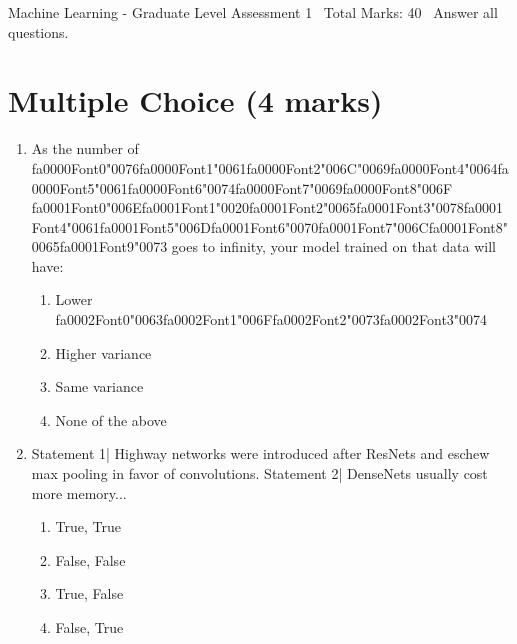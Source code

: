 \documentclass[12pt]{article}
\begin{document}
\begin{center}
Machine Learning - Graduate Level Assessment 1 \
Total Marks: 40 \
Answer all questions.
\end{center}

\section*{Multiple Choice (4 marks)}
\begin{enumerate}[label=\arabic*.]
\item As the number of {\csname fa0000Font0\endcsname\char"0076}{\csname fa0000Font1\endcsname\char"0061}{\csname fa0000Font2\endcsname\char"006C}{\char"0069}{\csname fa0000Font4\endcsname\char"0064}{\csname fa0000Font5\endcsname\char"0061}{\csname fa0000Font6\endcsname\char"0074}{\csname fa0000Font7\endcsname\char"0069}{\csname fa0000Font8\endcsname\char"006F} {\csname fa0001Font0\endcsname\char"006E}{\csname fa0001Font1\endcsname\char"0020}{\csname fa0001Font2\endcsname\char"0065}{\csname fa0001Font3\endcsname\char"0078}{\csname fa0001Font4\endcsname\char"0061}{\csname fa0001Font5\endcsname\char"006D}{\csname fa0001Font6\endcsname\char"0070}{\csname fa0001Font7\endcsname\char"006C}{\csname fa0001Font8\endcsname\char"0065}{\csname fa0001Font9\endcsname\char"0073} goes to infinity, your model trained on that data will have:
\begin{enumerate}[label=(\alph*)]
    \item Lower {\csname fa0002Font0\endcsname\char"0063}{\csname fa0002Font1\endcsname\char"006F}{\csname fa0002Font2\endcsname\char"0073}{\csname fa0002Font3\endcsname\char"0074}
    \item Higher variance
    \item Same variance
    \item None of the above
\end{enumerate}
\item Statement 1| Highway networks were introduced after ResNets and eschew max pooling in favor of convolutions. Statement 2| DenseNets usually cost more memory...
\begin{enumerate}[label=(\alph*)]
    \item True, True
    \item False, False
    \item True, False
    \item False, True
\end{enumerate}
\end{enumerate}
\end{document}
